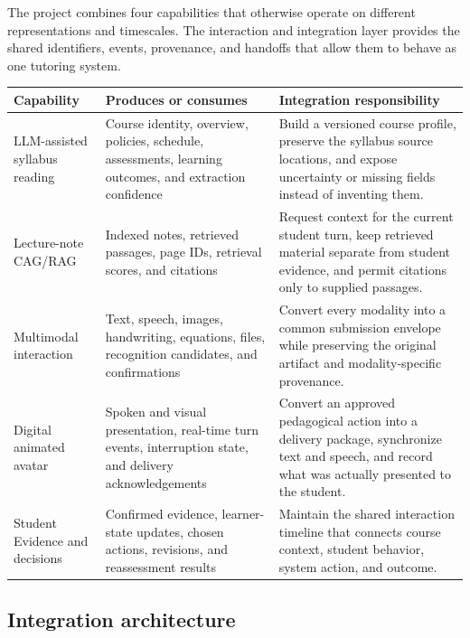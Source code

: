 \documentclass[11pt]{article}
\begin{document}
The project combines four capabilities that otherwise operate on different representations and timescales. The interaction and integration layer provides the shared identifiers, events, provenance, and handoffs that allow them to behave as one tutoring system.

\noindent\begin{tabularx}{\textwidth}{@{}p{}p{}X@{}}
\toprule
\textbf{Capability} & \textbf{Produces or consumes} & \textbf{Integration responsibility} \\
\midrule
LLM-assisted syllabus reading & Course identity, overview, policies, schedule, assessments, learning outcomes, and extraction confidence & Build a versioned course profile, preserve the syllabus source locations, and expose uncertainty or missing fields instead of inventing them. \\
Lecture-note CAG/RAG & Indexed notes, retrieved passages, page IDs, retrieval scores, and citations & Request context for the current student turn, keep retrieved material separate from student evidence, and permit citations only to supplied passages. \\
Multimodal interaction & Text, speech, images, handwriting, equations, files, recognition candidates, and confirmations & Convert every modality into a common submission envelope while preserving the original artifact and modality-specific provenance. \\
Digital animated avatar & Spoken and visual presentation, real-time turn events, interruption state, and delivery acknowledgements & Convert an approved pedagogical action into a delivery package, synchronize text and speech, and record what was actually presented to the student. \\
Student Evidence and decisions & Confirmed evidence, learner-state updates, chosen actions, revisions, and reassessment results & Maintain the shared interaction timeline that connects course context, student behavior, system action, and outcome. \\
\bottomrule
\end{tabularx}

\subsection{Integration architecture}
\end{document}
